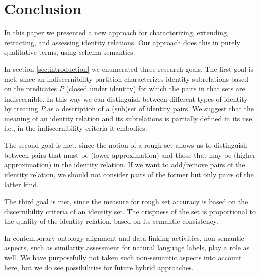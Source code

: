 \section{Conclusion}
\label{sec:conclusion}

In this paper we presented a new approach for characterizing,
  extending, retracting, and assessing identity relations.
Our approach does this in purely qualitative terms, using schema semantics.

In section \ref{sec:introduction} we enumerated three research goals.
The first goal is met, since an indiscernibility partition characterizes
  identity subrelations based on the predicates $P$ (closed under identity)
  for which the pairs in that sets are indiscernible.
In this way we can distinguish between different types of identity
  by treating $P$ as a description of a (sub)set of identity pairs.
We suggest that the meaning of an identity relation and its subrelations
  is partially defined in its use,
  i.e., in the indiscernibility criteria it embodies.

The second goal is met, since the notion of a rough set allows us to
  distinguish between pairs that must be (lower approximation)
  and those that may be (higher approximation)
  in the identity relation.
If we want to add/remove pairs of the identity relation,
  we should not consider pairs of the former but only pairs of
  the latter kind.

The third goal is met, since the measure for rough set accuracy
  is based on the discernibility criteria of an identity set.
The crispness of the set is proportional to the quality of the
  identity relation, based on its semantic consistency.

In contemporary ontology alignment and data linking activities,
  non-semantic aspects, such as similarity assessment
  for natural language labels, play a role as well.
We have purposefully not taken such non-semantic aspects into account here,
  but we do see possibilities for future hybrid approaches.

